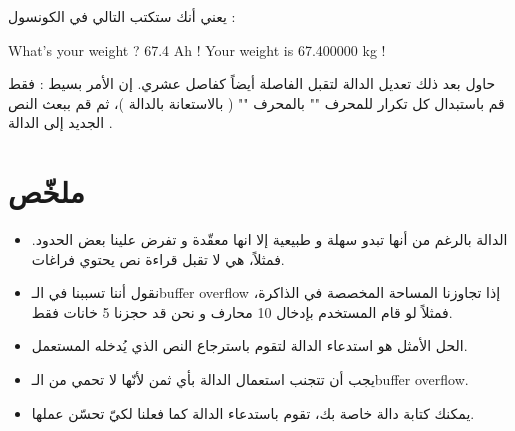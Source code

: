 يعني أنك ستكتب التالي في الكونسول :

\begin{Console}
  What's your weight ? 67.4
  Ah ! Your weight is 67.400000 kg !
\end{Console}


حاول بعد ذلك تعديل الدالة
لتقبل الفاصلة أيضاً كفاصل عشري. إن الأمر بسيط : فقط قم باستبدال كل تكرار للمحرف
"\InlineCode{,}"
بالمحرف
""
( بالاستعانة بالدالة
 )،
ثم قم ببعث النص الجديد إلى الدالة
.

\section{ملخّص}

\begin{itemize}
  \item الدالة
بالرغم من أنها تبدو سهلة و طبيعية إلا انها معقّدة و تفرض علينا بعض الحدود. فمثلاً، هي لا تقبل قراءة نص يحتوي فراغات.
  \item نقول أننا تسببنا في الـ\textenglish{buffer overflow}
إذا تجاوزنا المساحة المخصصة في الذاكرة، فمثلاً لو قام المستخدم بإدخال 10 محارف و نحن قد حجزنا 5 خانات فقط.
  \item الحل الأمثل هو استدعاء الدالة
لتقوم باسترجاع النص الذي يُدخله المستعمل.
  \item يجب أن تتجنب استعمال الدالة
بأي ثمن لأنّها لا تحمي من الـ\textenglish{buffer overflow}.
  \item يمكنك كتابة دالة خاصة بك، تقوم باستدعاء الدالة
كما فعلنا لكيّ تحسّن عملها.
\end{itemize}
